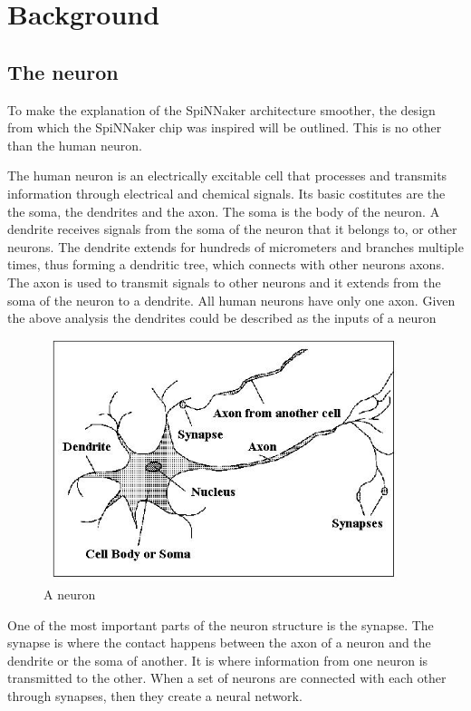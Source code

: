 \documentclass[12pt,a4paper]{article}
\begin{document}
\section{Background}
\subsection{The neuron}
To make the explanation of the SpiNNaker architecture smoother, the design from which the SpiNNaker chip was inspired will be outlined. This is no other than the human neuron.

The human neuron is an electrically excitable cell that processes and transmits information through electrical and chemical signals. Its basic costitutes are the the soma, the dendrites and the axon. The soma is the body of the neuron. A dendrite receives signals from the soma of the neuron that it belongs to, or other neurons. The dendrite extends for hundreds of micrometers and branches multiple times, thus forming a dendritic tree, which connects with other neurons axons. The axon is used to transmit signals to other neurons and it extends from the soma of the neuron to a dendrite. All human neurons have only one axon. Given the above analysis the dendrites could be described as the inputs of a neuron
\\[0.5cm]
\begin{figure}[h!]
\includegraphics[width=300pt,height=200pt,scale=2]{Pics/neuron.jpg}
\centering
\caption{A neuron}
\end{figure}

One of the most important parts of the neuron structure is the synapse. The synapse is where the contact happens between the axon of a neuron and the dendrite or the soma of another. It is where information from one neuron is transmitted to the other. When a set of neurons are connected with each other through synapses, then they create a neural network.
\end{document}
